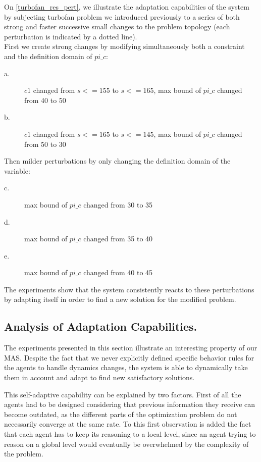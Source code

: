 On \figurename{} \ref{turbofan_res_pert}, we illustrate the adaptation capabilities of the system by subjecting turbofan problem we introduced previously to a series of both strong and faster successive small changes to the problem topology (each perturbation is indicated  by a dotted line). \\
First we create strong changes by modifying simultaneously both a constraint and the definition domain of $pi\_c$:
\begin{description}
\item[a.] $c1$ changed from $s <= 155$ to $s <= 165$, max bound of $pi\_c$ changed from 40 to 50
\item[b.] $c1$ changed from $s <= 165$ to $s <= 145$, max bound of $pi\_c$ changed from 50 to 30
\end{description}
 Then milder perturbations by only changing the definition domain of the variable:
\begin{description}
\item[c.] max bound of $pi\_c$ changed from 30 to 35
\item[d.] max bound of $pi\_c$ changed from 35 to 40
\item[e.] max bound of $pi\_c$ changed from 40 to 45
\end{description}
The experiments show that the system consistently reacts to these perturbations by adapting itself in order to find a new solution for the modified problem.

\subsection{Analysis of Adaptation Capabilities.}

The experiments presented in this section illustrate an interesting property of our MAS. Despite the fact that we never explicitly defined specific behavior rules for the agents to handle dynamics changes, the system is able to dynamically take them in account and adapt to find new satisfactory solutions.

This self-adaptive capability can be explained by two factors. First of all the agents had to be designed considering that previous information they receive can become outdated, as the different parts of the optimization problem do not necessarily converge at the same rate. To this first observation is added the fact that each agent has to keep its reasoning to a local level, since an agent trying to reason on a global level would eventually be overwhelmed by the complexity of the problem. 

